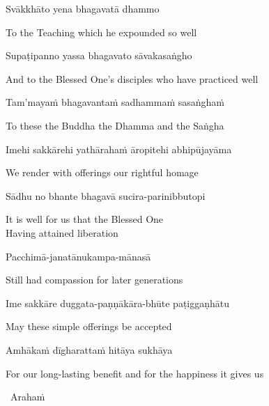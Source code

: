 Svākkhāto yena bhagavatā dhammo

\begin{english}
  To the Teaching which he expounded so well
\end{english}

Supaṭipanno yassa bhagavato sāvakasaṅgho

\begin{english}
  And to the Blessed One's disciples who have practiced well
\end{english}

Tam'mayaṁ bhagavantaṁ sadhammaṁ sasaṅghaṁ

\begin{english}
  To these the Buddha the Dhamma and the Saṅgha
\end{english}

Imehi sakkārehi yathārahaṁ āropitehi abhipūjayāma

\begin{english}
  We render with offerings our rightful homage
\end{english}

Sādhu no bhante bhagavā sucira-parinibbutopi

\begin{english}
  It is well for us that the Blessed One\\
  Having attained liberation
\end{english}

Pacchimā-janatānukampa-mānasā

\begin{english}
  Still had compassion for later generations
\end{english}

Ime sakkāre duggata-paṇṇākāra-bhūte paṭiggaṇhātu

\begin{english}
  May these simple offerings be accepted
\end{english}

Amhākaṁ dīgharattaṁ hitāya sukhāya

\begin{english}
  For our long-lasting benefit and for the happiness it gives us
\end{english}

\clearpage

\begin{leader}
  \anglebracketleft\ \hspace{-0.5mm}Arahaṁ \hspace{-0.5mm}\anglebracketright\
\end{leader}

